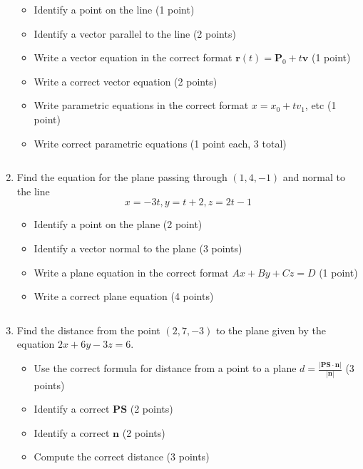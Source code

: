\documentclass[12pt]{article}
\newcommand{\up}{$~$\vspace*{-0.7in}}
\newcommand{\liner}{\noindent\underline{\hspace*{7in}}}
\renewcommand{\vec}{\mathbf}
\newcommand{\<}{\left<}
\renewcommand{\>}{\right>}
\begin{document}
\begin{enumerate}
\begin{itemize}
\item Identify a point on the line (1 point) 
\item Identify a vector parallel to the line (2 points) 
\item Write a vector equation in the correct format $\vec{r}(t)=\vec{P}_0+t\vec{v}$ (1 point) 
\item Write a correct vector equation (2 points) 
\item Write parametric equations in the correct format $x = x_0 + tv_1$, etc (1 point) 
\item Write correct parametric equations (1 point each, 3 total)
\end{itemize}

\vspace*{7in}

\liner
\newpage\up

\item Find the equation for the plane passing through $(1,4,-1)$ and normal to the line $$x=-3t, y=t+2, z=2t-1$$

\begin{itemize}
\item Identify a point on the plane (2 point) 
\item Identify a vector normal to the plane (3 points) 
\item Write a plane equation in the correct format $Ax + By + Cz = D$ (1 point) 
\item Write a correct plane equation (4 points)
\end{itemize}

\vspace*{7in}

\liner
\newpage\up

\item Find the distance from the point $(2,7,-3)$ to the plane given by the equation $2x+6y-3z=6$.

\begin{itemize}
\item Use the correct formula for distance from a point to a plane $d = \frac{|\vec{PS}\cdot\vec{n}|}{|\vec{n}|}$ (3 points)
\item Identify a correct $\vec{PS}$ (2 points) 
\item Identify a correct $\vec{n}$ (2 points) 
\item Compute the correct distance (3 points)
\end{itemize}


\end{enumerate}
\end{document}
